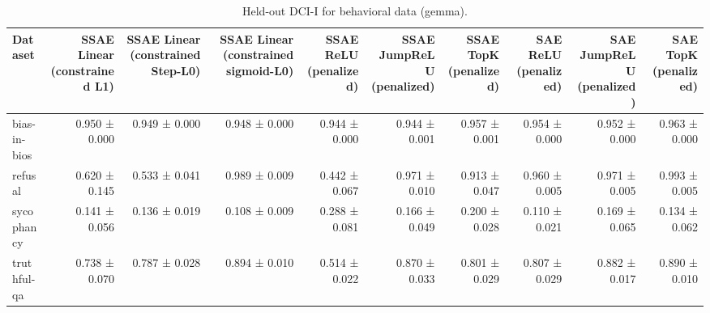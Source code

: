 \begin{table}[t]
\centering
\caption{Held-out DCI-I for behavioral data (gemma).}
\label{tab:behavioral-gemma-dci-i}
\begin{tabular}{lrrrrrrrrr}
\toprule
Dataset & SSAE Linear (constrained L1) & SSAE Linear (constrained Step-L0) & SSAE Linear (constrained sigmoid-L0) & SSAE ReLU (penalized) & SSAE JumpReLU (penalized) & SSAE TopK (penalized) & SAE ReLU (penalized) & SAE JumpReLU (penalized) & SAE TopK (penalized) \\
\midrule
bias-in-bios & 0.950 ± 0.000 & 0.949 ± 0.000 & 0.948 ± 0.000 & 0.944 ± 0.000 & 0.944 ± 0.001 & 0.957 ± 0.001 & 0.954 ± 0.000 & 0.952 ± 0.000 & 0.963 ± 0.000 \\
refusal & 0.620 ± 0.145 & 0.533 ± 0.041 & 0.989 ± 0.009 & 0.442 ± 0.067 & 0.971 ± 0.010 & 0.913 ± 0.047 & 0.960 ± 0.005 & 0.971 ± 0.005 & 0.993 ± 0.005 \\
sycophancy & 0.141 ± 0.056 & 0.136 ± 0.019 & 0.108 ± 0.009 & 0.288 ± 0.081 & 0.166 ± 0.049 & 0.200 ± 0.028 & 0.110 ± 0.021 & 0.169 ± 0.065 & 0.134 ± 0.062 \\
truthful-qa & 0.738 ± 0.070 & 0.787 ± 0.028 & 0.894 ± 0.010 & 0.514 ± 0.022 & 0.870 ± 0.033 & 0.801 ± 0.029 & 0.807 ± 0.029 & 0.882 ± 0.017 & 0.890 ± 0.010 \\
\bottomrule
\end{tabular}
\end{table}

